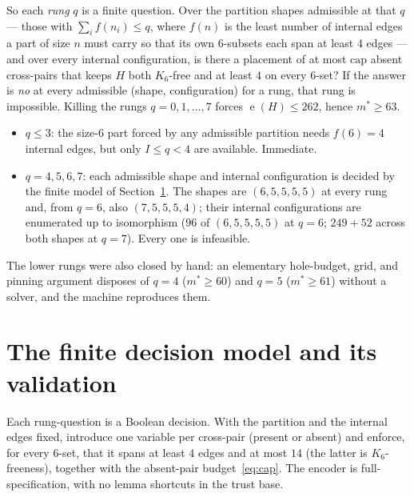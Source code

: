 \documentclass[11pt]{article}
\theoremstyle{definition}
\DeclareMathOperator{\ee}{e}
\newcommand{\mstar}{m^{*}}
\newcommand{\Kn}[1]{K_{#1}}
\begin{document}
So each \emph{rung} $q$ is a finite question. Over the partition shapes admissible
at that $q$ --- those with $\sum_i f(n_i) \le q$, where $f(n)$ is the least number
of internal edges a part of size $n$ must carry so that its own $6$-subsets each
span at least $4$ edges --- and over every internal configuration, is there a
placement of at most $\mathrm{cap}$ absent cross-pairs that keeps $H$ both
$\Kn{6}$-free and at least $4$ on every $6$-set? If the answer is \emph{no} at
every admissible (shape, configuration) for a rung, that rung is impossible.
Killing the rungs $q = 0, 1, \dots, 7$ forces $\ee(H) \le 262$, hence
$\mstar \ge 63$.

\begin{itemize}
  \item $q \le 3$: the size-$6$ part forced by any admissible partition needs
    $f(6) = 4$ internal edges, but only $I \le q < 4$ are available. Immediate.
  \item $q = 4, 5, 6, 7$: each admissible shape and internal configuration is
    decided by the finite model of Section~\ref{sec:model}. The shapes are
    $(6,5,5,5,5)$ at every rung and, from $q = 6$, also $(7,5,5,5,4)$; their
    internal configurations are enumerated up to isomorphism ($96$ of
    $(6,5,5,5,5)$ at $q = 6$; $249 + 52$ across both shapes at $q = 7$). Every one
    is infeasible.
\end{itemize}

The lower rungs were also closed by hand: an elementary hole-budget, grid, and
pinning argument disposes of $q = 4$ ($\mstar \ge 60$) and $q = 5$
($\mstar \ge 61$) without a solver, and the machine reproduces them.

\section{The finite decision model and its validation}\label{sec:model}

Each rung-question is a Boolean decision. With the partition and the internal edges
fixed, introduce one variable per cross-pair (present or absent) and enforce, for
every $6$-set, that it spans at least $4$ edges and at most $14$ (the latter is
$\Kn{6}$-freeness), together with the absent-pair budget~\eqref{eq:cap}. The
encoder is full-specification, with no lemma shortcuts in the trust base.
\end{document}
